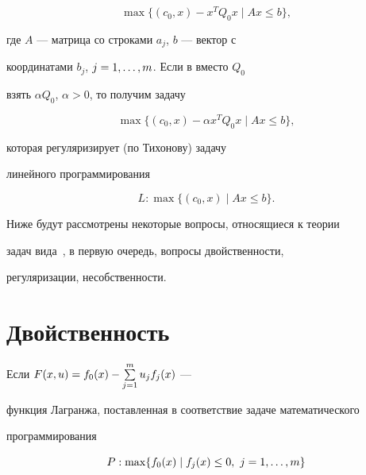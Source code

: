 \begin{equation}


\label{f2}


\max \{ (c_0, x) -x^T Q_0 x \mid Ax\le b \},


\end{equation}


где $A$ --- матрица со строками $a_j$, $b$ --- вектор с


координатами $b_j$, $j=1,\dotsc,m$. Если в  вместо $Q_0$


взять $\alpha Q_0$, $\alpha>0$, то получим задачу


\begin{equation}


\label{f3}


\max \{(c_0,x)-\alpha x^T Q_0 x\mid Ax\le b\},


\end{equation}


которая регуляризирует (по Тихонову) задачу


линейного программирования


$$


L:\max\{(c_0, x)\mid Ax\le b\}.


$$





Ниже будут рассмотрены некоторые вопросы, относящиеся к теории


задач вида~, в первую очередь, вопросы двойственности,


регуляризации, несобственности.





\section{Двойственность}\label{p1}





Если $F(x,u)=f_0(x)-\sum\limits_{j=1}^{m}u_j f_j(x)$ ---


функция Лагранжа, поставленная в соответствие задаче математического


программирования


\begin{equation}


\label{f4}


P:\max\{ f_0(x)\mid f_j(x) \le 0,\ j=\ij{m} \}


\end{equation}


